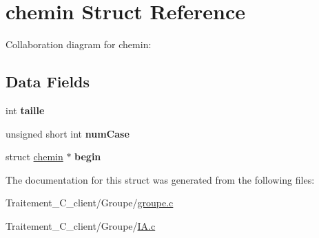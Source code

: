 \hypertarget{structchemin}{}\section{chemin Struct Reference}
\label{structchemin}


Collaboration diagram for chemin\+:
\subsection*{Data Fields}
\begin{DoxyCompactItemize}
\item 
int {\bfseries taille}\hypertarget{structchemin_a29bf3fc0ffe4e72e45f0c84ab4f8cd1e}{}\label{structchemin_a29bf3fc0ffe4e72e45f0c84ab4f8cd1e}

\item 
unsigned short int {\bfseries num\+Case}\hypertarget{structchemin_a839e5e9cb3976c4557ff9421edca312d}{}\label{structchemin_a839e5e9cb3976c4557ff9421edca312d}

\item 
struct \hyperlink{structchemin}{chemin} $\ast$ {\bfseries begin}\hypertarget{structchemin_a96269b4798d838bf3155363ad1cef230}{}\label{structchemin_a96269b4798d838bf3155363ad1cef230}

\end{DoxyCompactItemize}


The documentation for this struct was generated from the following files\+:\begin{DoxyCompactItemize}
\item 
Traitement\+\_\+\+C\+\_\+client/\+Groupe/\hyperlink{groupe_8c}{groupe.\+c}\item 
Traitement\+\_\+\+C\+\_\+client/\+Groupe/\hyperlink{_i_a_8c}{I\+A.\+c}\end{DoxyCompactItemize}
